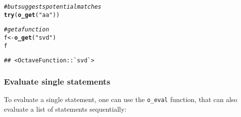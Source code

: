 \documentclass[english,10pt,a4paper]{article}\usepackage[]{graphicx}\usepackage[]{color}
\makeatletter
\newcommand{\hlstr}[1]{\textcolor[rgb]{0.192,0.494,0.8}{#1}}%
\newcommand{\hlcom}[1]{\textcolor[rgb]{0.678,0.584,0.686}{\textit{#1}}}%
\newcommand{\hlstd}[1]{\textcolor[rgb]{0.345,0.345,0.345}{#1}}%
\newcommand{\hlkwb}[1]{\textcolor[rgb]{0.69,0.353,0.396}{#1}}%
\newcommand{\hlkwd}[1]{\textcolor[rgb]{0.737,0.353,0.396}{\textbf{#1}}}%
\newenvironment{kframe}{%
 \def\at@end@of@kframe{}%
 \ifinner\ifhmode%
  \def\at@end@of@kframe{\end{minipage}}%
  \begin{minipage}{\columnwidth}%
 \fi\fi%
 \def\FrameCommand##1{\hskip\@totalleftmargin \hskip-\fboxsep
 \colorbox{shadecolor}{##1}\hskip-\fboxsep
     \hskip-\linewidth \hskip-\@totalleftmargin \hskip\columnwidth}%
 \MakeFramed {\advance\hsize-\width
   \@totalleftmargin\z@ \linewidth\hsize
   \@setminipage}}%
 {\par\unskip\endMakeFramed%
 \at@end@of@kframe}
\newenvironment{knitrout}{}{} %
\let\code=\texttt
\makeatother
\begin{document}
\begin{knitrout}
\begin{kframe}
{\ttfamily\noindent\bfseries\color{errorcolor}{\#\# Error: RcppOctave::o\_get - Could not find an Octave object named 'xxxxx'.}}\begin{alltt}
\hlcom{# but suggests potential matches}
\hlkwd{try}\hlstd{(}\hlkwd{o_get}\hlstd{(}\hlstr{"aa"}\hlstd{))}
\end{alltt}


{\ttfamily\noindent\bfseries\color{errorcolor}{\#\# Error: RcppOctave::o\_get - Could not find an Octave object named 'aa'.\\\#\#\ \ \ \ \ \ \ \ Match(es): aaa aab}}\begin{alltt}
\hlcom{# get a function}
\hlstd{f} \hlkwb{<-} \hlkwd{o_get}\hlstd{(}\hlstr{"svd"}\hlstd{)}
\hlstd{f}
\end{alltt}
\begin{verbatim}
## <OctaveFunction::`svd`>
\end{verbatim}
\end{kframe}
\end{knitrout}


\subsubsection{Evaluate single statements}

To evaluate a single statement, one can use the \code{o\_eval} function, that
can also evaluate a list of statements sequentially:
\end{document}
